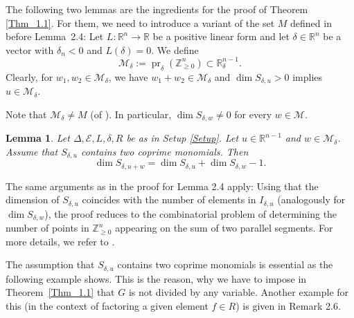 \documentclass[11pt]{amsart}
\theoremstyle{plain}
\newtheorem{Lem}[Thm]{Lemma}
\theoremstyle{definition}
\numberwithin{equation}{section}
\newcommand{\pr}{\operatorname{pr}}
\renewcommand{\d}{\delta}
\newcommand{\D}{\Delta}
\newcommand{\RR}{\mathbb R}
\newcommand{\ZZ}{{\mathbb Z}}
\newcommand{\cE}{\mathcal{E}}
\newcommand{\cM}{\mathcal{M}}
\newcommand{\gqz}{{\geq 0}}
\renewcommand{\(}{(\!(}
\renewcommand{\)}{)\!)}
\begin{document}
\smallskip

The following two lemmas are the ingredients for the proof of Theorem \ref{Thm_1.1}.
For them, we need to introduce a variant of the set $ M $ defined in \cite{GH} before Lemma~2.4:
Let $ L : \RR^n \to \RR $ be a positive linear form and let $ \d \in \RR^n $ be a vector with $ \d_n < 0 $ and $ L(\d) = 0 $.
We define
\[
	\cM_\d := \pr_\d ( \ZZ^n_\gqz )  \subset \RR^{n-1}_\d.
\]
Clearly, for $ w_1, w_2 \in \cM_\d $, we have $ w_1 + w_2 \in \cM_\d $ and 
$ \dim S_{\d,u} > 0 $ implies $ u \in \cM_\d $. 

Note that $ \cM_\d \neq M $ (of \cite{GH}).
In particular, $ \dim S_{\d,w} \neq 0 $ for every $ w \in \cM $. 
 
\begin{Lem}
	\label{Lem_2.4}
	Let $  \D, \cE, L, \d, R $ be as in Setup \ref{Setup}.
	Let $ u \in \RR^{n-1} $ and $ w \in \cM_\d $.
	Assume that $ S_{\d, u} $ contains two coprime monomials.
	Then 
	\[
		\dim S_{\d,u+w} = \dim S_{\d,u} + \dim S_{\d,w} - 1.
	\]
\end{Lem}

\noindent 
The same arguments as in the proof for \cite{GH} Lemma 2.4 apply:
Using that the dimension of $ S_{\d,u} $ coincides with the number of elements in $ I_{\d,u} $ 
(analogously for $ \dim S_{\d,w} $),
the proof reduces to the combinatorial problem of determining the number of points in $ \ZZ^n_\gqz $ appearing on the sum of two parallel segments.
For more details, we refer to \cite{GH}.

The assumption that $ S_{\d, u} $ contains two coprime monomials is essential as the following example shows.
This is the reason, why we have to impose in Theorem~\ref{Thm_1.1} that $ G $ is not divided by any variable.
Another example for this (in the context of factoring a given element $ f \in R $) is given in \cite{GH} Remark 2.6.  
\end{document}
